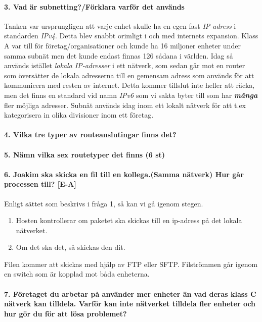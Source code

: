 \paragraph{3. Vad är subnetting?/Förklara varför det används}
Tanken var ursprungligen att varje enhet skulle ha en egen fast \textit{IP-adress} i standarden \textit{IPv4}. Detta blev snabbt orimligt i och med internets expansion. Klass A var till för företag/organisationer och kunde ha 16 miljoner enheter under samma subnät men det kunde endast finnas 126 sådana i världen. Idag så används istället \textit{lokala IP-adresser} i ett nätverk, som sedan går mot en router som översätter de lokala adresserna till en gemensam adress som används för att kommunicera med resten av internet. Detta kommer tillslut inte heller att räcka, men det finns en standard vid namn \textit{IPv6} som vi sakta byter till som har \textbf{\textit{många}} fler möjliga adresser. Subnät används idag inom ett lokalt nätverk för att t.ex kategorisera in olika divisioner inom ett företag.

\paragraph{4. Vilka tre typer av routeanslutingar finns det?}
 

\paragraph{5. Nämn vilka sex routetyper det finns (6 st)}
\paragraph{6. Joakim ska skicka en fil till en kollega.(Samma nätverk) Hur går processen till? [E-A]}

Enligt sättet som beskrivs i fråga 1, så kan vi gå igenom stegen.

\begin{enumerate}
	\item Hosten kontrollerar om paketet ska skickas till en ip-adress på det lokala nätverket.
	\item Om det ska det, så skickas den dit.
\end{enumerate}

Filen kommer att skickas med hjälp av FTP eller SFTP. Filströmmen går igenom en switch som är kopplad mot båda enheterna.

\paragraph{7. Företaget du arbetar på använder mer enheter än vad deras klass C nätverk kan tilldela. Varför kan inte nätverket tilldela fler enheter och hur gör du för att lösa problemet?}


